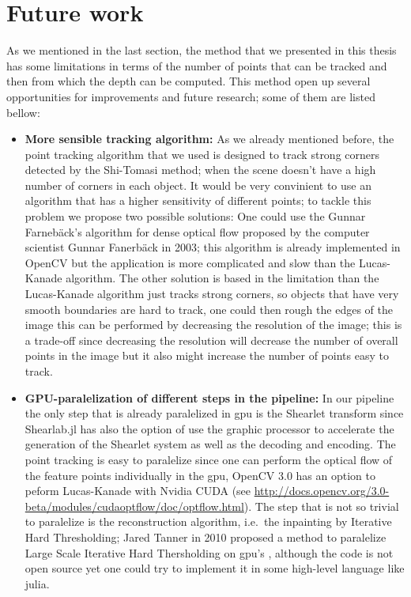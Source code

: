 \section{Future work}

As we mentioned in the last section, the method that we presented in this thesis has some limitations in terms of the number of points that can be tracked and then from which the depth can be computed. This method open up several opportunities for improvements and future research; some of them are listed bellow:

\begin{itemize}
\item \textbf{More sensible tracking algorithm:} As we already mentioned before, the point tracking algorithm that we used is designed to track strong corners detected by the Shi-Tomasi method; when the scene doesn't have a high number of corners in each object. It would be very convinient to use an algorithm that has a higher sensitivity of different points; to tackle this problem we propose two possible solutions: One could use the Gunnar Farneb\"ack's algorithm for dense optical flow proposed by the computer scientist Gunnar Fanerb\"ack in 2003\cite{Gunnar}; this algorithm is already implemented in OpenCV but the application is more complicated and slow than the Lucas-Kanade algorithm. The other solution is based in the limitation than the Lucas-Kanade algorithm just tracks strong corners, so objects that have very smooth boundaries are hard to track, one could then rough the edges of the image this can be performed by decreasing the resolution of the image; this is a trade-off since decreasing the resolution will decrease the number of overall points in the image but it also might increase the number of points easy to track. 

\item \textbf{GPU-paralelization of different steps in the pipeline:} In our pipeline the only step that is already paralelized in gpu is the Shearlet transform since Shearlab.jl has also the option of use the graphic processor to accelerate the generation of the Shearlet system as well as the decoding and encoding. The point tracking is easy to paralelize since one can perform the optical flow of the feature points individually in the gpu, OpenCV 3.0 has an option to peform Lucas-Kanade with Nvidia CUDA (see \url{http://docs.opencv.org/3.0-beta/modules/cudaoptflow/doc/optflow.html}). The step that is not so trivial to paralelize is the reconstruction algorithm, i.e.\ the inpainting by Iterative Hard Thresholding; Jared Tanner in 2010 proposed a method to paralelize Large Scale Iterative Hard Thersholding on gpu's \cite{Tanner}, although the code is not open source yet one could try to implement it in some high-level language like julia.


\end{itemize}
